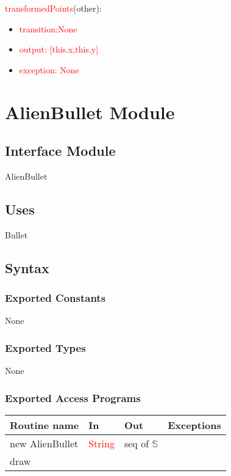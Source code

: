 \documentclass[12pt]{article}
\begin{document}
\noindent \textcolor{red}{transformedPoints}(other):
\begin{itemize}
\item \textcolor{red}{transition:None}
\item \textcolor{red}{output: [this.x,this.y]}
\item \textcolor{red}{exception: None}
\end{itemize}


\newpage

\section* {AlienBullet Module}

\subsection*{Interface Module}

AlienBullet

\subsection* {Uses}

Bullet

\subsection* {Syntax}

\subsubsection* {Exported Constants}

None

\subsubsection* {Exported Types}

None 

\subsubsection* {Exported Access Programs}

\begin{tabular}{| l | l | l | p{5cm} |}
\hline
\textbf{Routine name} & \textbf{In} & \textbf{Out} & \textbf{Exceptions}\\
\hline
new AlienBullet & \textcolor{red}{String}  & seq of $\mathbb{S}$ & ~\\
\hline
draw & ~ & ~ & ~\\
\hline


\end{tabular}
\end{document}
